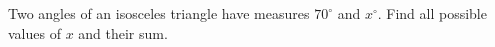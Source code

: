 Two angles of an isosceles triangle have measures $70^\circ$ and $x^\circ$. Find all possible values of $x$ and their sum.
